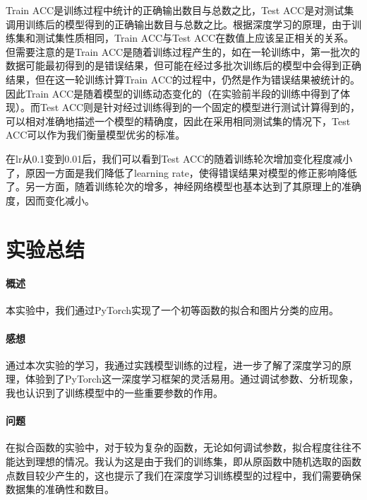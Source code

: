 \documentclass{article}
\begin{document}
Train ACC是训练过程中统计的正确输出数目与总数之比，Test ACC是对测试集调用训练后的模型得到的正确输出数目与总数之比。根据深度学习的原理，由于训练集和测试集性质相同，Train ACC与Test ACC在数值上应该呈正相关的关系。但需要注意的是Train ACC是随着训练过程产生的，如在一轮训练中，第一批次的数据可能最初得到的是错误结果，但可能在经过多批次训练后的模型中会得到正确结果，但在这一轮训练计算Train ACC的过程中，仍然是作为错误结果被统计的。因此Train ACC是随着模型的训练动态变化的（在实验前半段的训练中得到了体现）。而Test ACC则是针对经过训练得到的一个固定的模型进行测试计算得到的，可以相对准确地描述一个模型的精确度，因此在采用相同测试集的情况下，Test ACC可以作为我们衡量模型优劣的标准。

在lr从0.1变到0.01后，我们可以看到Test ACC的随着训练轮次增加变化程度减小了，原因一方面是我们降低了learning rate，使得错误结果对模型的修正影响降低了。另一方面，随着训练轮次的增多，神经网络模型也基本达到了其原理上的准确度，因而变化减小。

\section{实验总结}
\paragraph{概述}
本实验中，我们通过PyTorch实现了一个初等函数的拟合和图片分类的应用。

\paragraph{感想}
通过本次实验的学习，我通过实践模型训练的过程，进一步了解了深度学习的原理，体验到了PyTorch这一深度学习框架的灵活易用。通过调试参数、分析现象，我也认识到了训练模型中的一些重要参数的作用。

\paragraph{问题}
在拟合函数的实验中，对于较为复杂的函数，无论如何调试参数，拟合程度往往不能达到理想的情况。我认为这是由于我们的训练集，即从原函数中随机选取的函数点数目较少产生的，这也提示了我们在深度学习训练模型的过程中，我们需要确保数据集的准确性和数目。
\end{document}
